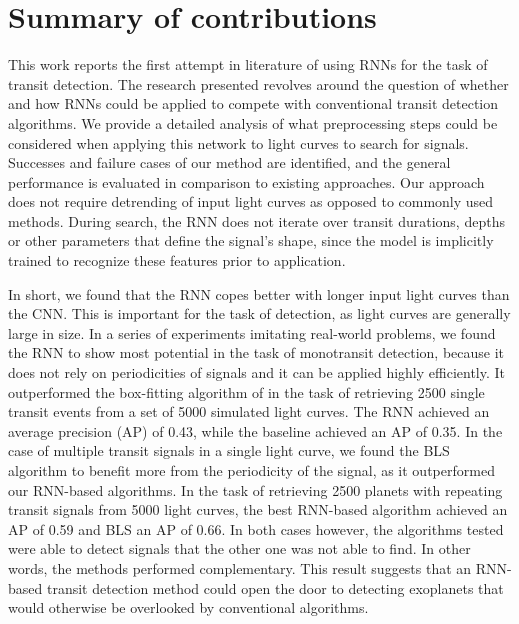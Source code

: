 
\section{Summary of contributions}
\label{sec:contributions}

This work reports the first attempt in literature of using RNNs for the task of transit detection. The research presented revolves around the question of whether and how RNNs could be applied to compete with conventional transit detection algorithms. We provide a detailed analysis of what preprocessing steps could be considered when applying this network to light curves to search for signals. Successes and failure cases of our method are identified, and the general performance is evaluated in comparison to existing approaches. Our approach does not require detrending of input light curves as opposed to commonly used methods. During search, the RNN does not iterate over transit durations, depths or other parameters that define the signal's shape, since the model is implicitly trained to recognize these features prior to application. 

In short, we found that the RNN copes better with longer input light curves than the CNN. This is important for the task of detection, as light curves are generally large in size. In a series of experiments imitating real-world problems, we found the RNN to show most potential in the task of monotransit detection, because it does not rely on periodicities of signals and it can be applied highly efficiently. It outperformed the box-fitting algorithm of \cite{foreman2016population} in the task of retrieving 2500 single transit events from a set of 5000 simulated light curves. The RNN achieved an  average precision (AP) of 0.43, while the baseline achieved an AP of 0.35. In the case of multiple transit signals in a single light curve, we found the BLS algorithm to benefit more from the periodicity of the signal, as it outperformed our RNN-based algorithms. In the task of retrieving 2500 planets with repeating transit signals from 5000 light curves, the best RNN-based algorithm achieved an AP of 0.59 and BLS an AP of 0.66. In both cases however, the algorithms tested were able to detect signals that the other one was not able to find. In other words, the methods performed complementary. This result suggests that an RNN-based transit detection method could open the door to detecting exoplanets that would otherwise be overlooked by conventional algorithms.